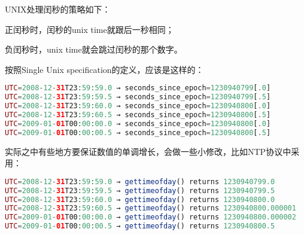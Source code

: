 UNIX处理闰秒的策略如下：

\begin{compactitem}
\item 正闰秒时，闰秒的unix time就跟后一秒相同；
\item 负闰秒时，unix time就会跳过闰秒的那个数字。
\end{compactitem}

按照Single Unix specification的定义，应该是这样的：



\begin{lstlisting}[language=PHP]
UTC=2008-12-31T23:59:59.0 → seconds_since_epoch=1230940799[.0]
UTC=2008-12-31T23:59:59.5 → seconds_since_epoch=1230940799[.5]
UTC=2008-12-31T23:59:60.0 → seconds_since_epoch=1230940800[.0]
UTC=2008-12-31T23:59:60.5 → seconds_since_epoch=1230940800[.5]
UTC=2009-01-01T00:00:00.0 → seconds_since_epoch=1230940800[.0]
UTC=2009-01-01T00:00:00.5 → seconds_since_epoch=1230940800[.5]
\end{lstlisting}

实际之中有些地方要保证数值的单调增长，会做一些小修改，比如NTP协议中采用：

\begin{lstlisting}[language=PHP]
UTC=2008-12-31T23:59:59.0 → gettimeofday() returns 1230940799.0
UTC=2008-12-31T23:59:59.5 → gettimeofday() returns 1230940799.5
UTC=2008-12-31T23:59:60.0 → gettimeofday() returns 1230940800.0
UTC=2008-12-31T23:59:60.5 → gettimeofday() returns 1230940800.000001
UTC=2009-01-01T00:00:00.0 → gettimeofday() returns 1230940800.000002
UTC=2009-01-01T00:00:00.5 → gettimeofday() returns 1230940800.5
\end{lstlisting}






\begin{lstlisting}[language=PHP]

\end{lstlisting}



\begin{lstlisting}[language=PHP]

\end{lstlisting}



\begin{lstlisting}[language=PHP]

\end{lstlisting}



